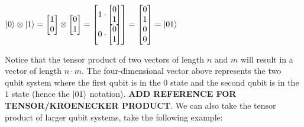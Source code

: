\documentclass{article}
\begin{document}
\begin{center}
	$
	\ket{0} \otimes \ket{1} =
	\begin{bmatrix}
		1 \\
		0 \\
	\end{bmatrix}
	\otimes
	\begin{bmatrix}
		0 \\
		1 \\
	\end{bmatrix}
	=
	\begin{bmatrix}
		1 \cdot
		\begin{bmatrix}
			0 \\
			1 \\
		\end{bmatrix} \\
		0 \cdot 
		\begin{bmatrix}
			0 \\
			1 \\
		\end{bmatrix} \\
	\end{bmatrix}
	=
	\begin{bmatrix}
		0 \\
		1 \\
		0 \\
		0 \\
	\end{bmatrix}
	=
	\ket{01}
	$
\end{center}

Notice that the tensor product of two vectors of length $n$ and $m$ will result in a vector of length $n \cdot m$. The four-dimensional vector above represents the two qubit 
system where the first qubit is in the $0$ state and the second qubit is in the $1$ state (hence the $\ket{01}$ notation). \textbf{ADD REFERENCE FOR TENSOR/KROENECKER PRODUCT}. 
We can also take the tensor product of larger qubit systems, take the following example:
\end{document}

